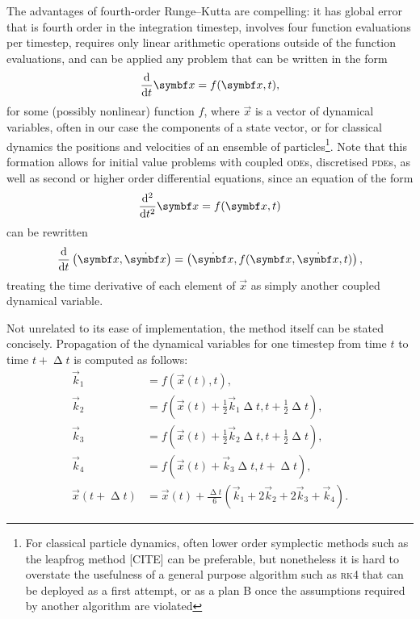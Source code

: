The advantages of fourth-order Runge--Kutta are compelling: it has global error that is fourth order in the integration timestep, involves four function evaluations per timestep, requires only linear arithmetic operations outside of the function evaluations, and can be applied any problem that can be written in the form
\begin{align}
\dv t \vec x = f(\vec x, t),
\end{align}
for some (possibly nonlinear) function $f$, where $\vec{x}$ is a vector of dynamical variables, often in our case the components of a state vector, or for classical dynamics the positions and velocities of an ensemble of particles\footnote{For classical particle dynamics, often lower order symplectic methods such as the leapfrog method [CITE] can be preferable, but nonetheless it is hard to overstate the usefulness of a general purpose algorithm such as \textsc{rk4} that can be deployed as a first attempt, or as a plan B once the assumptions required by another algorithm are violated}. Note that this formation allows for initial value problems with coupled \textsc{ode}s, discretised \textsc{pde}s, as well as second or higher order differential equations, since an equation of the form
\begin{align}
\dv[2] t \vec x = f(\vec x, t)
\end{align}
can be rewritten
\begin{align}
\dv t \left(\vec x, \dot{\vec x}\right) = \left(\dot{\vec x}, f(\vec x, \dot{\vec x}, t)\right),
\end{align}
treating the time derivative of each element of $\vec x$ as simply another coupled dynamical variable.

Not unrelated to its ease of implementation, the method itself can be stated concisely. Propagation of the dynamical variables for one timestep from time $t$ to time $t + \upDelta t$ is computed as follows:
\begin{align}
\vec k_1 &= f(\vec x(t), t),\nonumber\\
\vec k_2 &= f(\vec x(t) + \tfrac12 \vec k_1\upDelta t, t + \tfrac12\upDelta t),\nonumber\\
\vec k_3 &= f(\vec x(t) + \tfrac12 \vec k_2\upDelta t, t + \tfrac12\upDelta t),\nonumber\\
\vec k_4 &= f(\vec x(t) + \vec k_3\upDelta t, t + \upDelta t),\nonumber\\
\vec x(t + \upDelta t) &= \vec x(t)
+ \tfrac{\upDelta t}6(\vec k_1 + 2\vec k_2 + 2\vec k_3 + \vec k_4).\label{eq:rk4}
\end{align}

